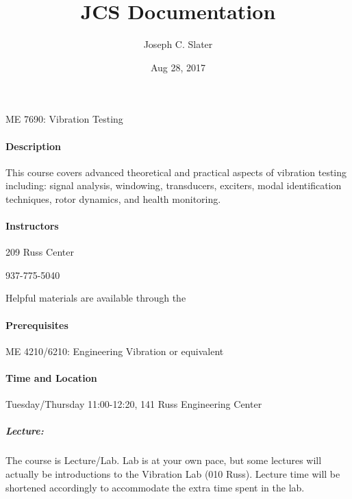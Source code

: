 \documentclass[letterpaper,10pt,english]{sphinxmanual}
\title{JCS Documentation}
\date{Aug 28, 2017}
\author{Joseph C. Slater}
\begin{document}
{\Large ME 7690: Vibration Testing}
\label{\detokenize{classes/vibrationtesting:old-exams}}\label{\detokenize{classes/vibrationtesting:me-7690-vibration-testing}}\label{\detokenize{classes/vibrationtesting::doc}}

\label{\detokenize{classes/vibrationtesting:must-read-stuff}}

\paragraph{Description}
\label{\detokenize{classes/ME7690Syll:description}}\label{\detokenize{classes/ME7690Syll::doc}}
This course covers advanced theoretical and practical aspects of
vibration testing including: signal analysis, windowing, transducers,
exciters, modal identification techniques, rotor dynamics, and health
monitoring.


\paragraph{Instructors}
\label{\detokenize{classes/ME7690Syll:instructors}}
\begin{DUlineblock}{0em}
\item[] 
\item[] 209 Russ Center
\item[] 937-775-5040
\end{DUlineblock}

\begin{DUlineblock}{0em}
\item[] Helpful materials are available through the 
\end{DUlineblock}


\paragraph{Prerequisites}
\label{\detokenize{classes/ME7690Syll:prerequisites}}
ME 4210/6210: Engineering Vibration or equivalent


\paragraph{Time and Location}
\label{\detokenize{classes/ME7690Syll:time-and-location}}
Tuesday/Thursday 11:00-12:20, 141 Russ Engineering Center


\subparagraph{Lecture:}
\label{\detokenize{classes/ME7690Syll:lecture}}
The course is Lecture/Lab. Lab is at
your own pace, but some lectures will actually be introductions to the
Vibration Lab (010 Russ). Lecture time will be shortened accordingly to
accommodate the extra time spent in the lab.
\end{document}
